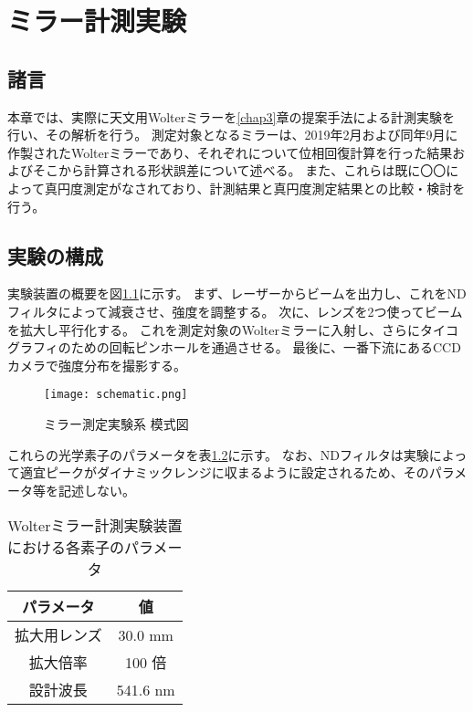 \chapter{ミラー計測実験}
\thispagestyle{empty}
\label{chap5}
\graphicspath{{chap5/figure/}}
\minitoc

\newpage


\section{諸言}
\label{chap5_introduction}

本章では、実際に天文用Wolterミラーを\ref{chap3}章の提案手法による計測実験を行い、その解析を行う。
測定対象となるミラーは、2019年2月および同年9月に作製されたWolterミラーであり、それぞれについて位相回復計算を行った結果およびそこから計算される形状誤差について述べる。
また、これらは既に〇〇によって真円度測定がなされており、計測結果と真円度測定結果との比較・検討を行う。

\clearpage
\newpage

\section{実験の構成}

実験装置の概要を図\ref{fig:mirror_experiment_schematic}に示す。
まず、レーザーからビームを出力し、これをNDフィルタによって減衰させ、強度を調整する。
次に、レンズを2つ使ってビームを拡大し平行化する。
これを測定対象のWolterミラーに入射し、さらにタイコグラフィのための回転ピンホールを通過させる。
最後に、一番下流にあるCCDカメラで強度分布を撮影する。

\begin{figure}[!ht]
\centering
\texttt{[image: schematic.png]}
\caption{ミラー測定実験系 模式図}
\label{fig:mirror_experiment_schematic}
\end{figure}

これらの光学素子のパラメータを表\ref{}に示す。
なお、NDフィルタは実験によって適宜ピークがダイナミックレンジに収まるように設定されるため、そのパラメータ等を記述しない。

\begin{table}[h]
\begin{center}
  \begin{tabular}{|c|c|} \hline
    パラメータ & 値 \\ \hline
    拡大用レンズ & 30.0 mm  \\
    拡大倍率 & 100 倍 \\
    設計波長 & 541.6 nm \\ \hline
  \end{tabular}
  \caption{Wolterミラー計測実験装置における各素子のパラメータ}
  \label{tb:mirror_experiment_params}
\end{center}
\end{table}


